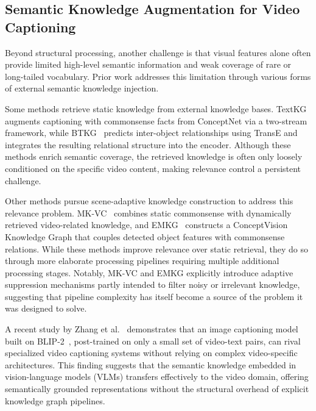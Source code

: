 \subsection{Semantic Knowledge Augmentation for Video Captioning}
\label{subsec:subsec_22_semantic}
Beyond structural processing, another challenge is that visual features alone often provide limited high-level semantic information and weak coverage of rare or long-tailed vocabulary. Prior work addresses this limitation through various forms of external semantic knowledge injection.

Some methods retrieve static knowledge from external knowledge bases. TextKG~\cite{guTextKnowledgeGraph2023} augments captioning with commonsense facts from ConceptNet via a two-stream framework, while BTKG~\cite{zhongBidirectionalTransformerKnowledge2024} predicts inter-object relationships using TransE and integrates the resulting relational structure into the encoder. Although these methods enrich semantic coverage, the retrieved knowledge is often only loosely conditioned on the specific video content, making relevance control a persistent challenge.

Other methods pursue scene-adaptive knowledge construction to address this relevance problem. MK-VC~\cite{sunSceneAdaptiveDynamic2026} combines static commonsense with dynamically retrieved video-related knowledge, and EMKG~\cite{sunGeneralizedVideoCaptioning2026} constructs a ConceptVision Knowledge Graph that couples detected object features with commonsense relations. While these methods improve relevance over static retrieval, they do so through more elaborate processing pipelines requiring multiple additional processing stages. Notably, MK-VC and EMKG explicitly introduce adaptive suppression mechanisms partly intended to filter noisy or irrelevant knowledge, suggesting that pipeline complexity has itself become a source of the problem it was designed to solve.

A recent study by Zhang et al.~\cite{zhangPretrainedImageTextModels2025} demonstrates that an image captioning model built on \mbox{BLIP-2~\cite{liBLIP2BootstrappingLanguageImage2023}}, post-trained on only a small set of video-text pairs, can rival specialized video captioning systems without relying on complex video-specific architectures. This finding suggests that the semantic knowledge embedded in vision-language models (VLMs) transfers effectively to the video domain, offering semantically grounded representations without the structural overhead of explicit knowledge graph pipelines.


